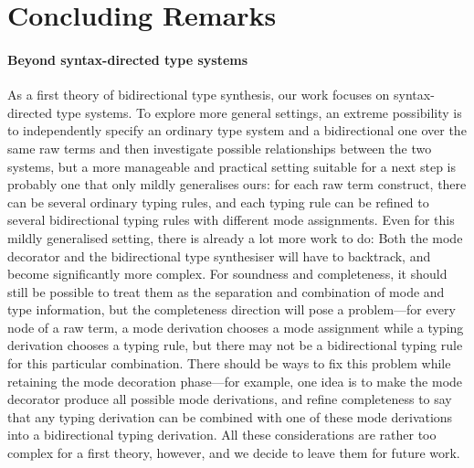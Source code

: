 
\section{Concluding Remarks} \label{sec:future}

\paragraph{Beyond syntax-directed type systems}

As a first theory of bidirectional type synthesis, our work focuses on syntax-directed type systems.
To explore more general settings, an extreme possibility is to independently specify an ordinary type system and a bidirectional one over the same raw terms and then investigate possible relationships between the two systems, but a more manageable and practical setting suitable for a next step is probably one that only mildly generalises ours: 
for each raw term construct, there can be several ordinary typing rules, and each typing rule can be refined to several bidirectional typing rules with different mode assignments.
Even for this mildly generalised setting, there is already a lot more work to do:
Both the mode decorator and the bidirectional type synthesiser will have to backtrack, and become significantly more complex.
For soundness and completeness, it should still be possible to treat them as the separation and combination of mode and type information, but the completeness direction will pose a problem---for every node of a raw term, a mode derivation chooses a mode assignment while a typing derivation chooses a typing rule, but there may not be a bidirectional typing rule for this particular combination.
There should be ways to fix this problem while retaining the mode decoration phase---for example, one idea is to make the mode decorator produce all possible mode derivations, and refine completeness to say that any typing derivation can be combined with one of these mode derivations into a bidirectional typing derivation.
All these considerations are rather too complex for a first theory, however, and we decide to leave them for future work.


